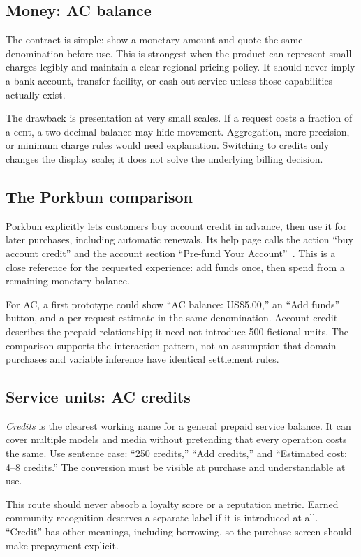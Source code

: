 \documentclass[10pt,letterpaper,twocolumn]{article}
\begin{document}
\subsection{Money: AC balance}
The contract is simple: show a monetary amount and quote the same denomination before use. This is strongest when the product can represent small charges legibly and maintain a clear regional pricing policy. It should never imply a bank account, transfer facility, or cash-out service unless those capabilities actually exist.

The drawback is presentation at very small scales. If a request costs a fraction of a cent, a two-decimal balance may hide movement. Aggregation, more precision, or minimum charge rules would need explanation. Switching to credits only changes the display scale; it does not solve the underlying billing decision.

\subsection{The Porkbun comparison}
Porkbun explicitly lets customers buy account credit in advance, then use it for later purchases, including automatic renewals. Its help page calls the action ``buy account credit'' and the account section ``Pre-fund Your Account''~\cite{porkbun}. This is a close reference for the requested experience: add funds once, then spend from a remaining monetary balance.

For AC, a first prototype could show ``AC balance: US\$5.00,'' an ``Add funds'' button, and a per-request estimate in the same denomination. Account credit describes the prepaid relationship; it need not introduce 500 fictional units. The comparison supports the interaction pattern, not an assumption that domain purchases and variable inference have identical settlement rules.

\subsection{Service units: AC credits}
\emph{Credits} is the clearest working name for a general prepaid service balance. It can cover multiple models and media without pretending that every operation costs the same. Use sentence case: ``250 credits,'' ``Add credits,'' and ``Estimated cost: 4--8 credits.'' The conversion must be visible at purchase and understandable at use.

This route should never absorb a loyalty score or a reputation metric. Earned community recognition deserves a separate label if it is introduced at all. ``Credit'' has other meanings, including borrowing, so the purchase screen should make prepayment explicit.
\end{document}
